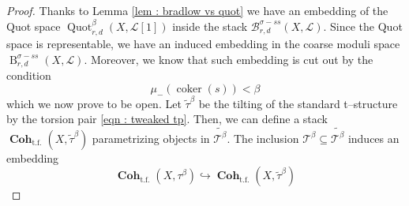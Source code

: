 \documentclass[11pt]{article}
\newcommand{\tbeta}{\mathcal{T}^{\beta}}
\newcommand{\cohflat}{\boldsymbol{\operatorname{Coh}}}
\newcommand{\Quotbetaonerd}{\operatorname{Quot}_{r,d}^{\beta}(X,\mathcal{L}[1])}
\newcommand{\bradstacklb}{\mathcal{B}^{\sigma - ss}_{r,d}(X,\mathcal{L})}
\newcommand{\bradlb}{\operatorname{{B}}^{\sigma - ss}_{r,d}(X,\mathcal{L})}
\begin{document}
\begin{proof}
    Thanks to Lemma \ref{lem : bradlow vs quot} we have an embedding of the Quot space $\Quotbetaonerd$ inside the stack $\bradstacklb$. Since the Quot space is representable, we have an induced embedding in the coarse moduli space $\bradlb$. Moreover, we know that such embedding is cut out by the condition
    \begin{equation}\label{eqn : condition bradlow vs quot}
        \mu_-(\operatorname{coker}(s)) < \beta
    \end{equation}
   which we now prove to be open. Let $\widetilde{\tau}^\beta$ be the tilting of the standard t--structure by the torsion pair \eqref{eqn : tweaked tp}. Then, we can define a stack $\cohflat_{\operatorname{t.f.}}(X,\widetilde{\tau}^{\beta})$ parametrizing objects in $\widetilde{\tbeta}$. The inclusion $\tbeta \subseteq \widetilde{\tbeta}$ induces an embedding
    \begin{equation}\label{eqn : inclusion of tbetas}
        \cohflat_{\operatorname{t.f.}}(X,{\tau}^{\beta}) \hookrightarrow \cohflat_{\operatorname{t.f.}}(X,\widetilde{{\tau}}^{\beta})
    \end{equation}

    \medskip
    

\end{proof}
\end{document}

